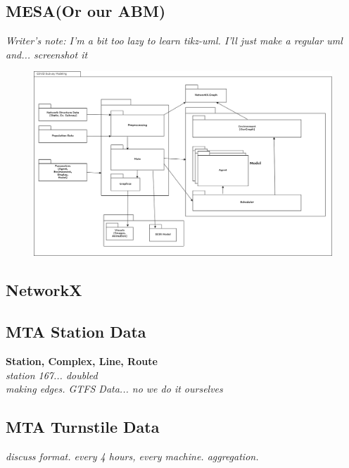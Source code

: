 \documentclass[12pt, a4, epsf] {article}
\theoremstyle{plain}
\theoremstyle{definition}
\begin{document}
\subsection*{MESA(Or our ABM)}
\textit{Writer's note: I'm a bit too lazy to learn tikz-uml. I'll just make a regular uml and... screenshot it\\}
\begin{figure}
\includegraphics[width = 1.0\textwidth]{Scratch_Visuals/covid_subway.png}
\end{figure}
\subsection*{NetworkX}
\subsection*{MTA Station Data}
\textbf{Station, Complex, Line, Route\\}
\textit{station 167... doubled\\}
\textit{making edges. GTFS Data... no we do it ourselves\\}
\subsection*{MTA Turnstile Data}
\textit{discuss format. every 4 hours, every machine. aggregation.\\}
\end{document}

